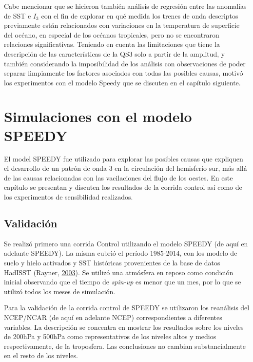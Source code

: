 \documentclass[spanish,a4paper,12pt]{book}
\begin{document}
Cabe mencionar que se hicieron también análisis de regresión entre las
anomalías de SST e \(I_3\) con el fin de explorar en qué medida los
trenes de onda descriptos previamente están relacionados con variaciones
en la temperatura de superficie del océano, en especial de los océanos
tropicales, pero no se encontraron relaciones significativas. Teniendo
en cuenta las limitaciones que tiene la descripción de las
características de la QS3 solo a partir de la amplitud, y también
considerando la imposibilidad de los análisis con observaciones de poder
separar limpiamente los factores asociados con todas las posibles
causas, motivó los experimentos con el modelo Speedy que se discuten en
el capítulo siguiente.

\chapter{Simulaciones con el modelo
SPEEDY}\label{simulaciones-con-el-modelo-speedy}

El model SPEEDY fue utilizado para explorar las posibles causas que
expliquen el desarrollo de un patrón de onda 3 en la circulación del
hemisferio sur, más allá de las causas relacionadas con las vacilaciones
del flujo de los oestes. En este capítulo se presentan y discuten los
resultados de la corrida control así como de los experimentos de
sensibilidad realizados.

\section{Validación}\label{validacion}

Se realizó primero una corrida Control utilizando el modelo SPEEDY (de
aquí en adelante SPEEDY). La misma cubrió el período 1985-2014, con los
modelo de suelo y hielo activados y SST históricas provenientes de la
base de datos HadISST (Rayner,
\protect\hyperlink{ref-Rayner2003}{2003}). Se utilizó una atmósfera en
reposo como condición inicial observando que el tiempo de \emph{spin-up}
es menor que un mes, por lo que se utilizó todos los meses de
simulación.

Para la validación de la corrida control de SPEEDY se utilizaron los
reanálisis del NCEP/NCAR (de aquí en adelante NCEP) correspondientes a
diferentes variables. La descripción se concentra en mostrar los
resultados sobre los niveles de 200hPa y 500hPa como representativos de
los niveles altos y medios respectivamente, de la troposfera. Las
conclusiones no cambian substancialmente en el resto de los niveles.
\end{document}
